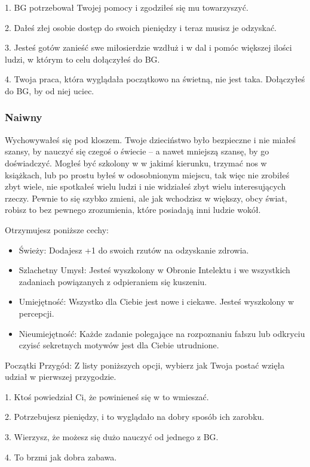 1. BG potrzebował Twojej pomocy i zgodziłeś się mu towarzyszyć.

2. Dałeś złej osobie dostęp do swoich pieniędzy i teraz musisz je odzyskać.

3. Jesteś gotów zanieść swe miłosierdzie wzdłuż i w dal i pomóc większej ilości ludzi, w którym to celu dołączyłeś do BG.

4. Twoja praca, która wyglądała początkowo na świetną, nie jest taka. Dołączyłeś do BG, by od niej uciec.

\subsubsection{Naiwny}

Wychowywałeś się pod kloszem. Twoje dzieciństwo było bezpieczne i nie miałeś szansy, by nauczyć się czegoś o świecie – a nawet mniejszą szansę, by go doświadczyć. Mogłeś być szkolony w w jakimś kierunku, trzymać nos w książkach, lub po prostu byłeś w odosobnionym miejscu, tak więc nie zrobiłeś zbyt wiele, nie spotkałeś wielu ludzi i nie widziałeś zbyt wielu interesujących rzeczy. Pewnie to się szybko zmieni, ale jak wchodzisz w większy, obcy świat, robisz to bez pewnego zrozumienia, które posiadają inni ludzie wokół. 

Otrzymujesz poniższe cechy:
\begin{itemize}
\item Świeży: Dodajesz +1 do swoich rzutów na odzyskanie zdrowia.
\item Szlachetny Umysł: Jesteś wyszkolony w Obronie Intelektu i we wszystkich zadaniach powiązanych z odpieraniem się kuszeniu.
\item Umiejętność: Wszystko dla Ciebie jest nowe i ciekawe. Jesteś wyszkolony w percepcji.
\item Nieumiejętność: Każde zadanie polegające na rozpoznaniu fałszu lub odkryciu czyisć sekretnych motywów jest dla Ciebie utrudnione.
\end{itemize}   
    
Początki Przygód: Z listy poniższych opcji, wybierz jak Twoja postać wzięła udział w pierwszej przygodzie.

1. Ktoś powiedział Ci, że powinieneś się w to wmieszać.

2. Potrzebujesz pieniędzy, i to wyglądało na dobry sposób ich zarobku.

3. Wierzysz, że możesz się dużo nauczyć od jednego z BG.

4. To brzmi jak dobra zabawa.

